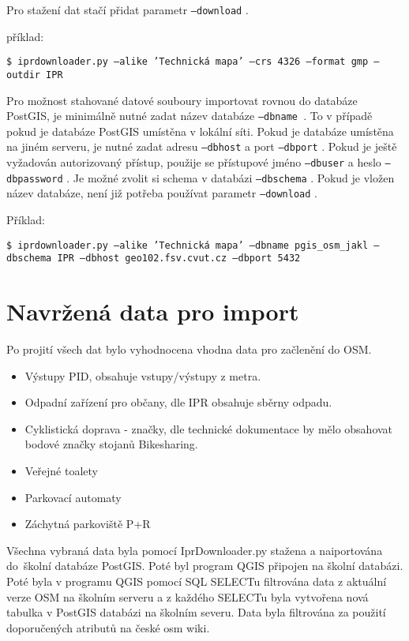 Pro stažení dat stačí přidat parametr {\tt ---download} .

příklad:

{\tt \$ iprdownloader.py ---alike 'Technická mapa' ---crs 4326 ---format gmp ---outdir IPR}

Pro možnost stahované datové souboury importovat rovnou do databáze PostGIS, je 
minimálně nutné zadat název databáze {\tt ---dbname }. To v případě pokud je
databáze PostGIS umístěna v lokální síti. Pokud je databáze umístěna na jiném
serveru, je nutné zadat adresu {\tt ---dbhost} a port {\tt ---dbport} . Pokud je
ještě vyžadován autorizovaný přístup, použije se přístupové jméno {\tt ---dbuser} a
heslo {\tt ---dbpassword} . Je možné zvolit si schema v databázi {\tt ---dbschema} . 
Pokud je vložen název databáze, není již potřeba používat parametr {\tt ---download} .

Příklad:

{\tt \$ iprdownloader.py ---alike 'Technická mapa' ---dbname pgis\_osm\_jakl ---dbschema IPR ---dbhost geo102.fsv.cvut.cz  ---dbport 5432 } 
 

\section{Navržená data pro import}
\label{Navržená data pro import}

Po projití všech dat bylo vyhodnocena vhodna data pro začlenění do OSM. 
\begin{itemize}
    \item   Výstupy PID, obsahuje vstupy/výstupy z metra.
    \item   Odpadní zařízení pro občany, dle IPR obsahuje sběrny odpadu. 
    \item   Cyklistická doprava - značky, dle technické dokumentace by mělo 
            obsahovat bodové značky stojanů Bikesharing.
    \item   Veřejné toalety
    \item   Parkovací automaty
    \item   Záchytná parkoviště P+R
\end{itemize}

Všechna vybraná data byla pomocí IprDownloader.py stažena a naiportována 
do~školní databáze PostGIS. Poté byl program QGIS připojen na školní databázi.
Poté byla v programu QGIS pomocí SQL SELECTu filtrována data z aktuální
verze OSM na školním serveru a z každého SELECTu byla vytvořena nová tabulka 
v PostGIS databázi na školním severu. Data byla filtrována za použití doporučených
atributů na české osm wiki. \cite{OSMfeatures}


